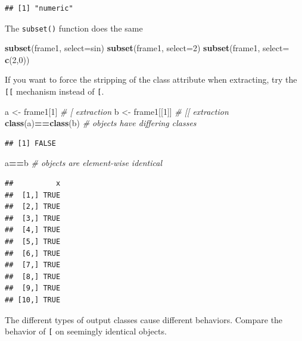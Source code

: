 \documentclass[]{book}
\newenvironment{Shaded}{\begin{snugshade}}{\end{snugshade}}
\newcommand{\CommentTok}[1]{\textcolor[rgb]{0.56,0.35,0.01}{\textit{#1}}}
\newcommand{\DataTypeTok}[1]{\textcolor[rgb]{0.13,0.29,0.53}{#1}}
\newcommand{\DecValTok}[1]{\textcolor[rgb]{0.00,0.00,0.81}{#1}}
\newcommand{\KeywordTok}[1]{\textcolor[rgb]{0.13,0.29,0.53}{\textbf{#1}}}
\newcommand{\NormalTok}[1]{#1}
\newcommand{\OperatorTok}[1]{\textcolor[rgb]{0.81,0.36,0.00}{\textbf{#1}}}
\newcommand{\StringTok}[1]{\textcolor[rgb]{0.31,0.60,0.02}{#1}}
\theoremstyle{definition}
\theoremstyle{definition}
\theoremstyle{definition}
\theoremstyle{remark}
\begin{document}
\begin{verbatim}
## [1] "numeric"
\end{verbatim}

The \texttt{subset()} function does the same

\begin{Shaded}
\begin{Highlighting}[]
\KeywordTok{subset}\NormalTok{(frame1, }\DataTypeTok{select=}\NormalTok{sin) }
\KeywordTok{subset}\NormalTok{(frame1, }\DataTypeTok{select=}\DecValTok{2}\NormalTok{)}
\KeywordTok{subset}\NormalTok{(frame1, }\DataTypeTok{select=} \KeywordTok{c}\NormalTok{(}\DecValTok{2}\NormalTok{,}\DecValTok{0}\NormalTok{))}
\end{Highlighting}
\end{Shaded}

If you want to force the stripping of the class attribute when extracting, try the \texttt{{[}{[}} mechanism instead of \texttt{{[}}.

\begin{Shaded}
\begin{Highlighting}[]
\NormalTok{a <-}\StringTok{ }\NormalTok{frame1[}\DecValTok{1}\NormalTok{] }\CommentTok{# [ extraction}
\NormalTok{b <-}\StringTok{ }\NormalTok{frame1[[}\DecValTok{1}\NormalTok{]] }\CommentTok{# [[ extraction}
\KeywordTok{class}\NormalTok{(a)}\OperatorTok{==}\KeywordTok{class}\NormalTok{(b) }\CommentTok{# objects have differing classes}
\end{Highlighting}
\end{Shaded}

\begin{verbatim}
## [1] FALSE
\end{verbatim}

\begin{Shaded}
\begin{Highlighting}[]
\NormalTok{a}\OperatorTok{==}\NormalTok{b }\CommentTok{# objects are element-wise identical }
\end{Highlighting}
\end{Shaded}

\begin{verbatim}
##          x
##  [1,] TRUE
##  [2,] TRUE
##  [3,] TRUE
##  [4,] TRUE
##  [5,] TRUE
##  [6,] TRUE
##  [7,] TRUE
##  [8,] TRUE
##  [9,] TRUE
## [10,] TRUE
\end{verbatim}

The different types of output classes cause different behaviors. Compare the behavior of \texttt{{[}} on seemingly identical objects.
\end{document}

